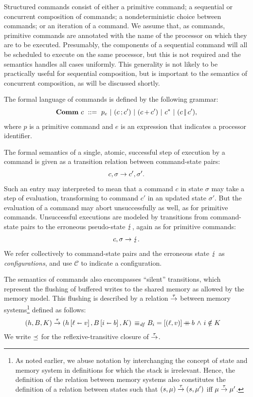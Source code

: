 \documentclass[11pt]{report}
\begin{document}
Structured commands consist of either a primitive command; a sequential or concurrent composition of commands; a nondeterministic choice between commands; or an iteration of a command. We assume that, as commands, primitive commands are annotated with the name of the processor on which they are to be executed. Presumably, the components of a sequential command will all be scheduled to execute on the same processor, but this is not required and the semantics handles all cases uniformly. This generality is not likely to be practically useful for sequential composition, but is important to the semantics of concurrent composition, as will be discussed shortly. 

The formal language of commands is defined by the following grammar: \[ \mathbf{Comm}~c ~::=~ p_e ~|~ (c \operatorname{;} c') ~|~ (c \operatorname{+} c') ~|~ c^{\operatorname{\ast}} ~|~ (c \operatorname{|\!|} c'),\] where $p$ is a primitive command and $e$ is an expression that indicates a processor identifier.  

The formal semantics of a single, atomic, successful step of execution by a command is given as a transition relation between command-state pairs: \[ c,\sigma \rightarrow c',\sigma'.\] Such an entry may interpreted to mean that a command $c$ in state $\sigma$ may take a step of evaluation, transforming to command $c'$ in an updated state $\sigma'$. But the evaluation of a command may abort unsuccessfully as well, as for primitive commands. Unsuccessful executions are modeled by transitions from command-state pairs to the erroneous pseudo-state $\lightning$, again as for primitive commands: \[ c,\sigma \rightarrow \lightning. \] We refer collectively to command-state pairs and the erroneous state $\lightning$ as \emph{configurations}, and use $\mathcal{C}$ to indicate a configuration. 

The semantics of commands also encompasses ``silent'' transitions, which represent the flushing of buffered writes to the shared memory as allowed by the memory model. This flushing is described by a relation $\stackrel{\tau}{\rightarrow}$ between memory systems\footnote{As noted earlier, we abuse notation by interchanging the concept of state and memory system in definitions for which the stack is irrelevant. Hence, the definition of the relation between memory systems  also constitutes the definition of a relation between states such that $(s,\mu) \stackrel{\tau}{\rightarrow} (s,\mu')$ iff $\mu \stackrel{\tau}{\rightarrow} \mu'$.} defined as follows: \begin{align*} (h,B,K) \stackrel{\tau}{\rightarrow} (h \left[ \ell \shortleftarrow v \right],B \left[ i \shortleftarrow b \right],K) \operatorname{\;\equiv_{\mathit{df}}\;} & B_i = \left[(\ell,v)\right] \operatorname{+\!\!\!+} b \operatorname{\,\wedge\,} i \notin K 
\end{align*} We write $\preceq$ for the reflexive-transitive closure of $\stackrel{\tau}{\rightarrow}$. 
\end{document}
